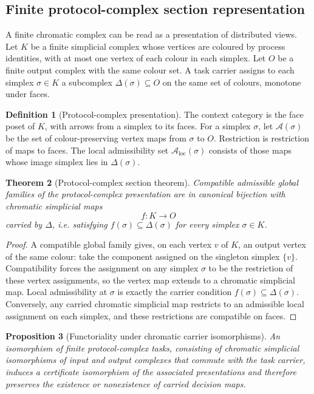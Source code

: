 \documentclass[11pt]{article}
\theoremstyle{plain}
\newtheorem{theorem}{Theorem}[section]
\newtheorem{proposition}[theorem]{Proposition}
\theoremstyle{definition}
\newtheorem{definition}[theorem]{Definition}
\theoremstyle{remark}
\newcommand{\LocalAdm}{\mathcal{A}_{\mathrm{loc}}}
\begin{document}
\subsection{Finite protocol-complex section representation}
\label{subsec:protocol-complex-representation}

A finite chromatic complex can be read as a presentation of distributed views.
Let $K$ be a finite simplicial complex whose vertices are coloured by process
identities, with at most one vertex of each colour in each simplex. Let $O$ be a
finite output complex with the same colour set. A task carrier assigns to each
simplex $\sigma\in K$ a subcomplex $\Delta(\sigma)\subseteq O$ on the same set of
colours, monotone under faces.

\begin{definition}[Protocol-complex presentation]
\label{def:protocol-complex-presentation}
The context category is the face poset of $K$, with arrows from a simplex to its
faces. For a simplex $\sigma$, let $\mathcal A(\sigma)$ be the set of
colour-preserving vertex maps from $\sigma$ to $O$. Restriction is restriction of
maps to faces. The local admissibility set $\LocalAdm(\sigma)$ consists of those
maps whose image simplex lies in $\Delta(\sigma)$.
\end{definition}

\begin{theorem}[Protocol-complex section theorem]
\label{thm:protocol-complex-section}
Compatible admissible global families of the protocol-complex presentation are
in canonical bijection with chromatic simplicial maps
\[
f:K\longrightarrow O
\]
carried by $\Delta$, i.e. satisfying $f(\sigma)\subseteq\Delta(\sigma)$ for every
simplex $\sigma\in K$.
\end{theorem}

\begin{proof}
A compatible global family gives, on each vertex $v$ of $K$, an output vertex of
the same colour: take the component assigned on the singleton simplex $\{v\}$.
Compatibility forces the assignment on any simplex $\sigma$ to be the restriction
of these vertex assignments, so the vertex map extends to a chromatic simplicial
map. Local admissibility at $\sigma$ is exactly the carrier condition
$f(\sigma)\subseteq\Delta(\sigma)$. Conversely, any carried chromatic simplicial
map restricts to an admissible local assignment on each simplex, and these
restrictions are compatible on faces.
\end{proof}

\begin{proposition}[Functoriality under chromatic carrier isomorphisms]
\label{prop:protocol-complex-functoriality}
An isomorphism of finite protocol-complex tasks, consisting of chromatic
simplicial isomorphisms of input and output complexes that commute with the task
carrier, induces a certificate isomorphism of the associated presentations and
therefore preserves the existence or nonexistence of carried decision maps.
\end{proposition}
\end{document}
